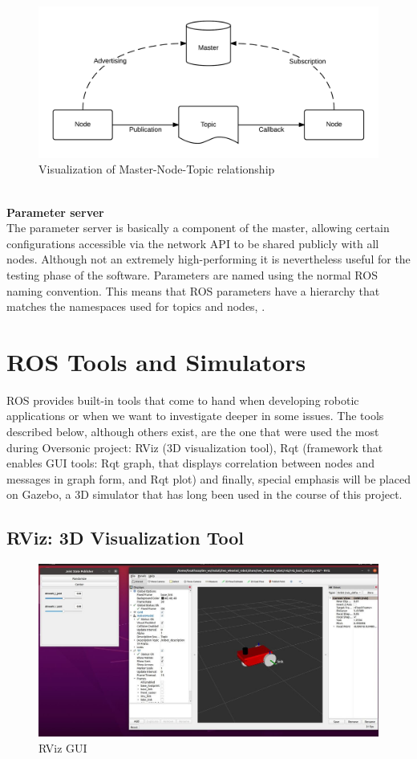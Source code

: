\begin{figure}[H]
    \centering
    \includegraphics{Images/Chapter 1/ROS-master-node-topic.png}
    \caption{Visualization of Master-Node-Topic relationship}
    \label{fig:master-node-topic}
\end{figure}
\\
\newline
\textbf{Parameter server}\\
The parameter server is basically a component of the master, allowing certain configurations accessible via the network API to be shared publicly with all nodes. Although not an extremely high-performing it is nevertheless useful for the testing phase of the software. Parameters are named using the normal ROS naming convention. This means that ROS parameters have a hierarchy that matches the namespaces used for topics and nodes, \citet{rosparmserv}.

\newpage
\section{ROS Tools and Simulators}
ROS provides built-in tools that come to hand when developing robotic applications or when we want to investigate deeper in some issues.
The tools described below, although others exist, are the one that were used the most during Oversonic project: RViz (3D visualization tool), Rqt (framework that enables GUI tools: Rqt graph, that displays correlation between nodes and messages in graph form, and Rqt plot) and finally, special emphasis will be placed on Gazebo, a 3D simulator that has long been used in the course of this project.
\subsection{RViz: 3D Visualization Tool}
\begin{figure}
    \centering
    \includegraphics[scale = 0.5]{Images/Chapter 1/rviz.jpg}
    \caption{RViz GUI}
    \label{fig:rvizgui}
\end{figure}
